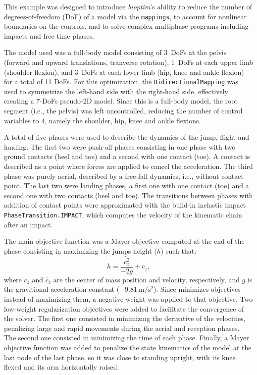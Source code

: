 This example was designed to introduce \emph{bioptim}'s ability to reduce the number of degrees-of-freedom (DoF) of a model via the \texttt{mappings}, to account for nonlinear boundaries on the controls, and to solve complex multiphase programs including impacts and free time phases.

The model used was a full-body model consisting of 3~DoFs at the pelvis (forward and upward translations, tranverse rotation), 1~DoFs at each upper limb (shoulder flexion), and 3~DoFs at each lower limb (hip, knee and ankle flexion) for a total of 11 DoFs.
For this optimization, the \texttt{BidirectionalMapping} was used to symmetrize the left-hand side with the right-hand side, effectively creating a 7-DoFs pseudo-2D model. 
Since this is a full-body model, the root segment (i.e., the pelvis) was left uncontrolled, reducing the number of control variables to 4, namely the shoulder, hip, knee and ankle flexions. 

A total of five phases were used to describe the dynamics of the jump, flight and landing. 
The first two were push-off phases consisting in one phase with two ground contacts (heel and toe) and a second with one contact (toe). 
A contact is described as a point where forces are applied to cancel the acceleration. 
The third phase was purely aerial, described by a free-fall dynamics, i.e., without contact point.
The last two were landing phases, a first one with one contact (toe) and a second one with two contacts (heel and toe).
The transitions between phases with addition of contact points were approximated with the build-in inelastic impact \texttt{PhaseTransition.IMPACT}, which computes the velocity of the kinematic chain after an impact.

The main objective function was a Mayer objective computed at the end of the  phase consisting in maximizing the jumps height ($h$) such that:
\[
h = \frac{\dot{c_z^2}}{-2 g} + c_z,
\]
where $c_z$ and $\dot{c_z}$ are the center of mass position and velocity, respectively, and $g$ is the gravitional acceleration constant ($\SI{-9.81}{\meter/\second^2}$).
Since \bioptim minimizes objectives instead of maximizing them, a negative weight was applied to that objective. 
Two low-weight regularization objectives were added to facilitate the convergence of the solver.
The first one consisted in minimizing the derivative of the velocities, penalizing large and rapid movements during the aerial and reception phases. 
The second one consisted in minimizing the time of each phase.
Finally, a Mayer objective function was added to penalize the state kinematics of the model at the last node of the last phase, so it was close to standing upright, with its knee flexed and its arm horizontally raised. 


